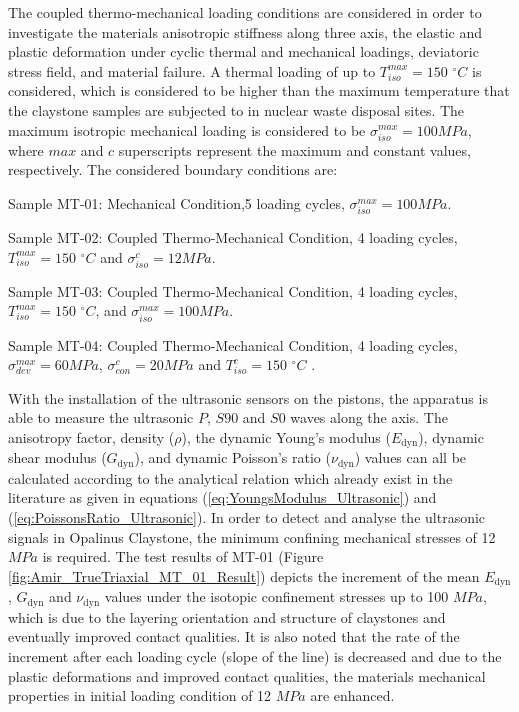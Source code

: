 The coupled thermo-mechanical loading conditions are considered in order to investigate the materials anisotropic stiffness along three axis, the elastic and plastic deformation under cyclic thermal and mechanical loadings, deviatoric stress field, and material failure. A thermal loading of up to $T_{iso}^{max}=150$ $^{\circ}C$ is considered, which is considered to be higher than the maximum temperature that the claystone samples are subjected to in nuclear waste disposal sites. The maximum isotropic mechanical loading is considered to be $\sigma_{iso}^{max}=100 MPa$, where $max$ and $c$ superscripts represent the maximum and constant values, respectively. The considered boundary conditions are:

\begin{list}{-}{\leftmargin=1em \itemindent=0em \itemsep=0em}
  \item Sample MT-01: Mechanical Condition,5 loading cycles, $\sigma_{iso}^{max}=100 MPa$.
  \item Sample MT-02: Coupled Thermo-Mechanical Condition, 4 loading cycles, $T_{iso}^{max}=150$ $^{\circ}C$ and $\sigma_{iso}^{c}=12 MPa$.
  \item Sample MT-03: Coupled Thermo-Mechanical Condition, 4 loading cycles, $T_{iso}^{max}=150$ $^{\circ}C$, and $\sigma_{iso}^{max}=100 MPa$.
  \item Sample MT-04: Coupled Thermo-Mechanical Condition, 4 loading cycles, $\sigma_{dev}^{max}=60 MPa$, $\sigma_{con}^{c}= 20 MPa$ and $T_{iso}^{c}=150$ $^{\circ}C$ .
\end{list}

With the installation of the ultrasonic sensors on the pistons, the apparatus is able to measure the ultrasonic $P$, $S90$ and $S0$ waves along the axis. The anisotropy factor, density ($\rho$), the dynamic Young’s modulus ($E_\text{dyn}$), dynamic shear modulus ($G_\text{dyn}$), and dynamic Poisson’s ratio ($\nu_\text{dyn}$) values can all be calculated according to the analytical relation which already exist in the literature \cite{Motraetal2018} as given in equations (\ref{eq:YoungsModulus_Ultrasonic}) and (\ref{eq:PoissonsRatio_Ultrasonic}). In order to detect and analyse the ultrasonic signals in Opalinus Claystone, the minimum confining mechanical stresses of 12 $MPa$ is required. The test results of MT-01 (Figure \ref{fig:Amir_TrueTriaxial_MT_01_Result}) depicts the increment of the mean $E_\text{dyn}$, $G_\text{dyn}$ and $\nu_\text{dyn}$ values under the isotopic confinement stresses up to 100 $MPa$, which is due to the layering orientation and structure of claystones and eventually improved contact qualities. It is also noted that the rate of the increment after each loading cycle (slope of the line) is decreased and due to the plastic deformations and improved contact qualities, the materials mechanical properties in initial loading condition of 12 $MPa$ are enhanced. 

